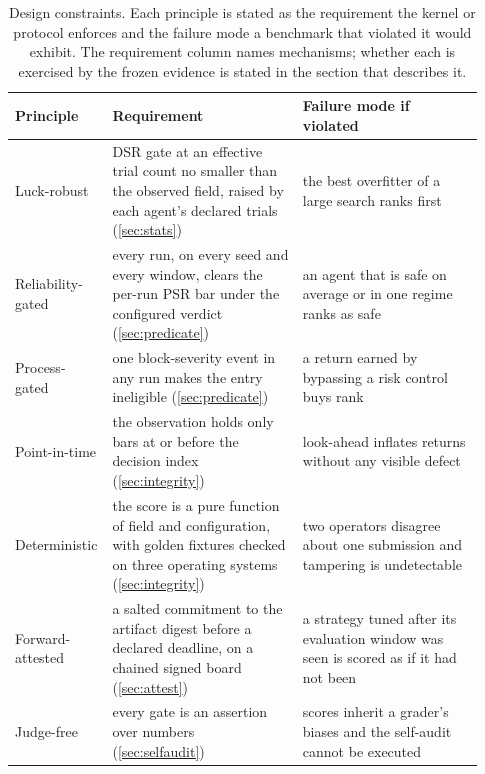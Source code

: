 \begin{table}[t]
\centering
\footnotesize
\setlength{\tabcolsep}{4pt}
\caption{Design constraints. Each principle is stated as the requirement the kernel or protocol enforces and the failure mode a benchmark that violated it would exhibit. The requirement column names mechanisms; whether each is exercised by the frozen evidence is stated in the section that describes it.}
\label{tab:design-constraints}
\begin{tabular}{>{\raggedright\arraybackslash}p{0.15\linewidth}>{\raggedright\arraybackslash}p{0.4\linewidth}>{\raggedright\arraybackslash}p{0.38\linewidth}}
\toprule
Principle & Requirement & Failure mode if violated \\
\midrule
Luck-robust & DSR gate at an effective trial count no smaller than the observed field, raised by each agent's declared trials (\cref{sec:stats}) & the best overfitter of a large search ranks first \\
Reliability-gated & every run, on every seed and every window, clears the per-run PSR bar under the configured verdict (\cref{sec:predicate}) & an agent that is safe on average or in one regime ranks as safe \\
Process-gated & one block-severity event in any run makes the entry ineligible (\cref{sec:predicate}) & a return earned by bypassing a risk control buys rank \\
Point-in-time & the observation holds only bars at or before the decision index (\cref{sec:integrity}) & look-ahead inflates returns without any visible defect \\
Deterministic & the score is a pure function of field and configuration, with golden fixtures checked on three operating systems (\cref{sec:integrity}) & two operators disagree about one submission and tampering is undetectable \\
Forward-attested & a salted commitment to the artifact digest before a declared deadline, on a chained signed board (\cref{sec:attest}) & a strategy tuned after its evaluation window was seen is scored as if it had not been \\
Judge-free & every gate is an assertion over numbers (\cref{sec:selfaudit}) & scores inherit a grader's biases and the self-audit cannot be executed \\
\bottomrule
\end{tabular}
\end{table}

